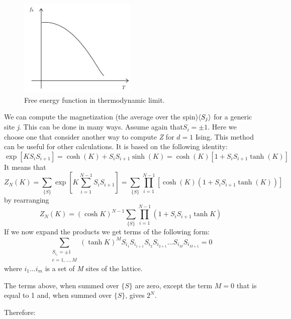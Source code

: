 \documentclass[../main/main.tex]{subfiles}
\begin{document}
\begin{figure}[h!]
\centering
\includegraphics[width=0.5\textwidth]{../lessons/6_image/3.pdf}
\caption{\label{fig:6_3} Free energy function in thermodynamic limit.}
\end{figure}
We can compute the magnetization (the average over the spin)\( \expval{S_j}  \) for a generic site \emph{j}. This can be done in many ways. Assume again that\( S_i = \pm 1 \). Here we choose one that consider another way to compute \emph{Z} for \( d=1 \) Ising. This method can be useful for other calculations. It is based on the following identity:
\begin{equation}
  \exp [ K S_i S_{i+1}] = \cosh ( K) + S_i S_{i+1} \sinh (K) = \cosh (K) [1+ S_i S_{i+1} \tanh (K)]
\end{equation}
It means that
\begin{equation}
  Z_N (K) = \sum_{\{ S \}  }^{}    \exp [K  \sum_{i=1}^{N-1} S_i S_{i+1}  ] = \sum_{\{ S \}  }^{}   \prod_{i=1}^{N-1} [ \cosh (K) (1+ S_i S_{i+1} \tanh (K))]
\end{equation}
by rearranging
\begin{equation}
  Z_N (K)= (\cosh K)^{N-1} \sum_{\{S\}}^{}  \prod_{i=1}^{N-1} ( 1 + S_i S_{i+1} \tanh K )
\end{equation}
If we now expand the products we get terms of the following form:
\begin{equation}
  \sum_{ \substack{ S_{i_e} = \pm 1\\ e= 1, \dots, M} }^{}  (\tanh K )^M S_{i_1} S_{i_{1+1}} S_{i_2} S_{i_{2+1}} \dots S_{i_M} S_{i_{M+1}} = 0
  \label{eq:6_3}
\end{equation}
where \( i_1 \dots i_m \) is a set of \emph{M} sites of the lattice.
\begin{remark}
The terms above, when summed over \( \{ S \}   \) are zero, except the term \( M=0 \) that is equal to 1 and, when summed over \( \{ S \}   \), gives \( 2^N \).
\end{remark}
Therefore:
\end{document}
